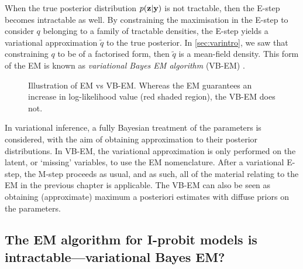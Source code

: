 When the true posterior distribution $p({\mathbf z}|{\mathbf y})$ is not tractable, then the E-step becomes intractable as well.
By constraining the maximisation in the E-step to consider $q$ belonging to a family of tractable densities, the E-step yields a variational approximation $\tilde q$ to the true posterior.
In \cref{sec:varintro}, we saw that constraining $q$ to be of a factorised form, then $\tilde q$ is a mean-field density.
This form of the EM is known as \emph{variational Bayes EM algorithm} (VB-EM) \citep{beal2003}.

\begin{figure}[p]
  \centering
  \energyemEstep \hspace{0.5cm}
  \energyvbEstep
  \energyemMstep \hspace{0.5cm}
  \energyvbMstepa
  \energyemMstepfade \hspace{0.5cm}
  \energyvbMstepb
  \energyemMstepfade \hspace{0.5cm}
  \energyvbMstepc
  \vspace{-1em} 
  \caption{Illustration of EM vs VB-EM. Whereas the EM guarantees an increase in log-likelihood value (red shaded region), the VB-EM does not.}
\end{figure}

In variational inference, a fully Bayesian treatment of the parameters is considered, with the aim of obtaining approximation to their posterior distributions.
In VB-EM, the variational approximation is only performed on the latent, or `missing' variables, to use the EM nomenclature.
After a variational E-step, the M-step proceeds as usual, and as such, all of the material relating to the EM in the previous chapter is applicable.
The VB-EM can also be seen as obtaining (approximate) maximum a posteriori estimates with diffuse priors on the parameters.

\subsection{The EM algorithm for I-probit models is intractable---variational Bayes EM?}
\label{sec:vbemiprobit}


